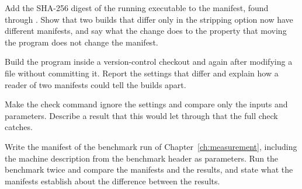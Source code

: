 \begin{exercise}
Add the SHA-256 digest of the running executable to the manifest, found through . Show that two builds that differ only in the stripping option now have different manifests, and say what the change does to the property that moving the program does not change the manifest.
\end{exercise}

\begin{exercise}
Build the program inside a version-control checkout and again after modifying a file without committing it. Report the settings that differ and explain how a reader of two manifests could tell the builds apart.
\end{exercise}

\begin{exercise}
Make the check command ignore the settings and compare only the inputs and parameters. Describe a result that this would let through that the full check catches.
\end{exercise}

\begin{exercise}
Write the manifest of the benchmark run of Chapter~\ref{ch:measurement}, including the machine description from the benchmark header as parameters. Run the benchmark twice and compare the manifests and the results, and state what the manifests establish about the difference between the results.
\end{exercise}
